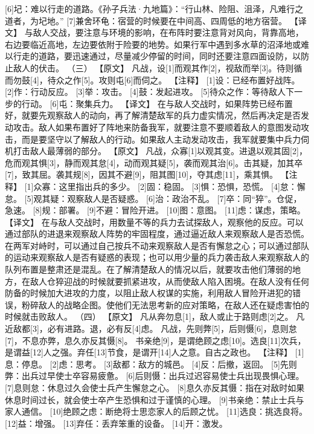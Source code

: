 \documentclass[a4paper,12pt,UTF8,twoside]{ctexbook}
\begin{document}
[6]圮：难以行走的道路。《孙子兵法·九地篇》：“行山林、险阻、沮泽，凡难行之道者，为圮地。”
[7]兼舍环龟：宿营的时候要在中间高、四周低的地方宿营。
【译文】
与敌人交战，要注意与环境的影响，在布阵时要注意背对风向，背靠高地，右边要临近高地，左边要依附于险要的地势。如果行军中遇到多水草的沼泽地或难以行走的道路，要迅速通过，尽量减少停留的时间，同时还要注意四面设防，以防止敌人的伏击。
（三）
【原文】
凡战，设[1]而观其作[2]，视敌而举[3]。待则循而勿鼓[4]，待众之作[5]。攻则屯[6]而伺之。
【注释】
[1]设：已经布置好战阵。
[2]作：行动反应。
[3]举：攻击。
[4]鼓：发起进攻。
[5]待众之作：等待敌人下一步的行动。
[6]屯：聚集兵力。
【译文】
在与敌人交战时，如果阵势已经布置好，就要先观察敌人的动向，再了解清楚敌军的兵力虚实情况，然后再决定是否发动攻击。敌人如果布置好了阵地来防备我军，就要注意不要顺着敌人的意图发动攻击，而是要坚守以了解敌人的行动。如果敌人主动发动攻击，我军就要集中兵力伺机打击敌人最薄弱的部分。
【原文】
凡战，众寡[1]以观其变。进退以观其固[2]，危而观其惧[3]，静而观其怠[4]，动而观其疑[5]，袭而观其治[6]。击其疑，加其卒[7]，致其屈。袭其规[8]，因其不避[9]，阻其图[10]，夺其虑[11]，乘其惧。
【注释】
[1]众寡：这里指出兵的多少。
[2]固：稳固。
[3]惧：恐惧，恐慌。
[4]怠：懈怠。
[5]观其疑：观察敌人是否疑惑。
[6]治：政治不乱。
[7]卒：同“猝”。仓促，急速。
[8]规：部署。
[9]不避：冒险开进。
[10]图：意图。
[11]虑：谋虑，策略。
【译文】
在与敌人交战时，用数量不等的兵力去试探敌人，观察他的反应。可以通过部队的进退来观察敌人阵势的牢固程度，通过逼近敌人来观察敌人是否恐慌。在两军对峙时，可以通过自己按兵不动来观察敌人是否有懈怠之心；可以通过部队的运动来观察敌人是否有疑惑的表现；也可以用少量的兵力袭击敌人来观察敌人的队列布置是整肃还是混乱。在了解清楚敌人的情况以后，就要攻击他们薄弱的地方，在敌人仓猝迎战的时候就要抓紧进攻，从而使敌人陷入困境。在敌人没有任何防备的时候加大进攻的力度，以阻止敌人权谋的实施，利用敌人冒险开进犯的错误，粉碎敌人的战略企图。使他们无法思考新的应对策略，在敌人还在疑虑害怕的时候就击败敌人。
（四）
【原文】
凡从奔勿息[1]，敌人或止于路则虑[2]之。
凡近敌都[3]，必有进路。退，必有反[4]虑。
凡战，先则弊[5]，后则慑[6]，息则怠[7]，不息亦弊，息久亦反其慑[8]。
书亲绝[9]，是谓绝顾之虑[10]。选良[11]次兵，是谓益[12]人之强。弃任[13]节食，是谓开[14]人之意。自古之政也。
【注释】
[1]息：停息。
[2]虑：思考。
[3]敌都：敌方的城邑。
[4]反：后撤，返回。
[5]先则弊：出兵过早使士卒容易疲惫。
[6]后则慑：出兵过迟容易使士兵出现畏惧心理。
[7]息则怠：休息过久会使士兵产生懈怠之心。
[8]息久亦反其慑：指在对敌时如果休息时间过长，就会使士卒产生恐惧和过于谨慎的心理。
[9]书亲绝：禁止士兵与家人通信。
[10]绝顾之虑：断绝将士思恋家人的后顾之忧。
[11]选良：挑选良将。
[12]益：增强。
[13]弃任：丢弃笨重的设备。
[14]开：激发。
\end{document}
